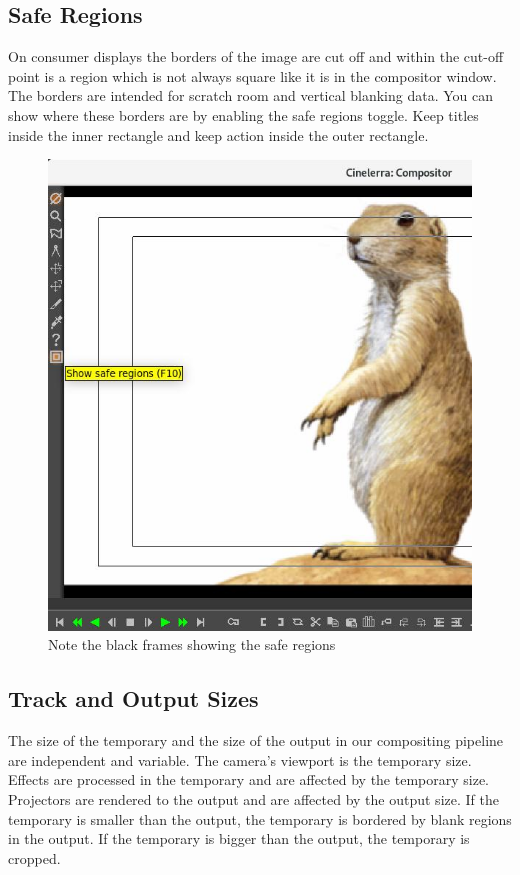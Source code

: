 \subsection{Safe Regions}%
\label{sub:safe_regions}

On consumer displays the borders of the image are cut off and within the cut-off point is a region which is not always square like it is in the compositor window. 
The borders are intended for scratch room and vertical blanking data. 
You can show where these borders are by enabling the safe regions toggle. 
Keep titles inside the inner rectangle and keep action inside the outer rectangle.

\begin{figure}[htpb]
    \centering
    \includegraphics[width=0.6\linewidth]{images/safe_regions.png}
    \caption{Note the black frames showing the safe regions}
    \label{fig:safe_regions}
\end{figure}

\subsection{Track and Output Sizes}%
\label{sub:track_and_output_sizes}


The size of the temporary and the size of the output in our compositing pipeline are independent and variable. 
The camera's viewport is the temporary size. 
Effects are processed in the temporary and are affected by the temporary size. 
Projectors are rendered to the output and are affected by the output size. 
If the temporary is smaller than the output, the temporary is bordered by blank regions in the output. 
If the temporary is bigger than the output, the temporary is cropped.


